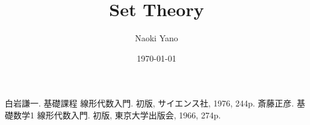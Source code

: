 \documentclass[a4paper,10pt,report]{amsart}
\title{Set Theory}
\author{Naoki Yano}
\date{\today}
\theoremstyle{plain}
\theoremstyle{definition}
\theoremstyle{remark}
\begin{document}
    \maketitle
    \tableofcontents
    \part{}
    \begin{thebibliography}{9}
        白岩謙一. 基礎課程 線形代数入門. 初版, サイエンス社, 1976, 244p.
        斎藤正彦. 基礎数学1 線形代数入門. 初版, 東京大学出版会, 1966, 274p.
    \end{thebibliography}
    
\end{document}
